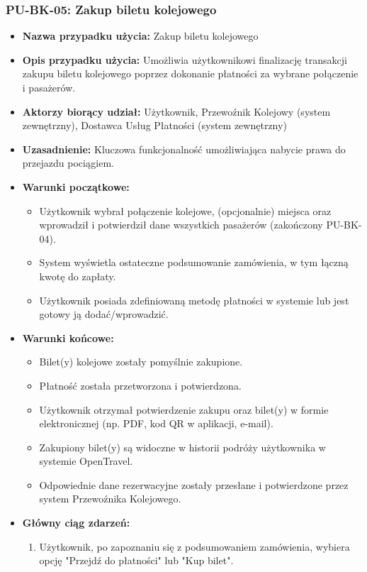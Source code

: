 \documentclass[a4paper,12pt]{article}
\begin{document}
\subsubsection{PU-BK-05: Zakup biletu kolejowego}
\begin{itemize}
\item \textbf{Nazwa przypadku użycia:} Zakup biletu kolejowego
\item \textbf{Opis przypadku użycia:} Umożliwia użytkownikowi finalizację transakcji zakupu biletu kolejowego poprzez dokonanie płatności za wybrane połączenie i pasażerów.
\item \textbf{Aktorzy biorący udział:} Użytkownik, Przewoźnik Kolejowy (system zewnętrzny), Dostawca Usług Płatności (system zewnętrzny)
\item \textbf{Uzasadnienie:} Kluczowa funkcjonalność umożliwiająca nabycie prawa do przejazdu pociągiem.
\item \textbf{Warunki początkowe:}
\begin{itemize}
\item Użytkownik wybrał połączenie kolejowe, (opcjonalnie) miejsca oraz wprowadził i potwierdził dane wszystkich pasażerów (zakończony PU-BK-04).
\item System wyświetla ostateczne podsumowanie zamówienia, w tym łączną kwotę do zapłaty.
\item Użytkownik posiada zdefiniowaną metodę płatności w systemie lub jest gotowy ją dodać/wprowadzić.
\end{itemize}
\item \textbf{Warunki końcowe:}
\begin{itemize}
\item Bilet(y) kolejowe zostały pomyślnie zakupione.
\item Płatność została przetworzona i potwierdzona.
\item Użytkownik otrzymał potwierdzenie zakupu oraz bilet(y) w formie elektronicznej (np. PDF, kod QR w aplikacji, e-mail).
\item Zakupiony bilet(y) są widoczne w historii podróży użytkownika w systemie OpenTravel.
\item Odpowiednie dane rezerwacyjne zostały przesłane i potwierdzone przez system Przewoźnika Kolejowego.
\end{itemize}
\item \textbf{Główny ciąg zdarzeń:}
\begin{enumerate}
\item Użytkownik, po zapoznaniu się z podsumowaniem zamówienia, wybiera opcję "Przejdź do płatności" lub "Kup bilet".

\end{enumerate}
\end{itemize}
\end{document}

